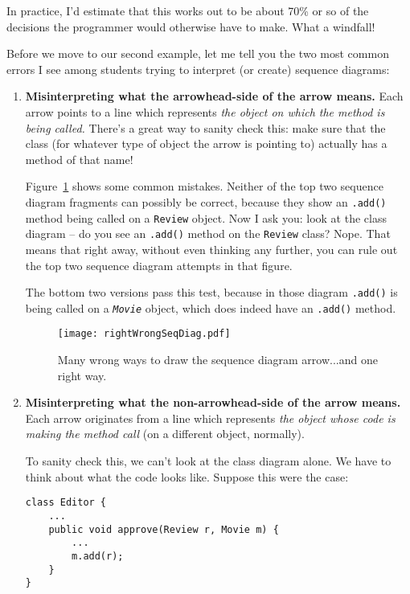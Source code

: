 In practice, I'd estimate that this works out to be about 70\% or so of the
decisions the programmer would otherwise have to make. What a windfall!

Before we move to our second example, let me tell you the two most common
errors I see among students trying to interpret (or create) sequence diagrams:

\begin{enumerate}
\itemsep.1em
\item \textbf{Misinterpreting what the arrowhead-side of the arrow means.}
Each arrow points to a line which represents \textit{the object on which the
method is being called.} There's a great way to sanity check this: make sure
that the class (for whatever type of object the arrow is pointing to) actually
has a method of that name!

Figure~\ref{fig:rightWrongSeqDiag} shows some common mistakes. Neither of the
top two sequence diagram fragments can possibly be correct, because they show
an \texttt{.add()} method being called on a \texttt{Review} object. Now I ask
you: look at the class diagram -- do you see an \texttt{.add()} method on the
\texttt{Review} class? Nope. That means that right away, without even thinking
any further, you can rule out the top two sequence diagram attempts in that
figure.

The bottom two versions pass this test, because in those diagram
\texttt{.add()} is being called on a \textit{\texttt{Movie}} object, which
does indeed have an \texttt{.add()} method.

\begin{figure}
\centering
\texttt{[image: rightWrongSeqDiag.pdf]}  %
\caption{Many wrong ways to draw the sequence diagram arrow...and one right
way.}
\label{fig:rightWrongSeqDiag}
\end{figure}

\item \textbf{Misinterpreting what the non-arrowhead-side of the arrow means.}
Each arrow originates from a line which represents \textit{the object whose
code is making the method call} (on a different object, normally). 

To sanity check this, we can't look at the class diagram alone. We have to
think about what the code looks like. Suppose this were the case:

\begin{Verbatim}[fontsize=\small,samepage=true,frame=single]
class Editor {
    ...
    public void approve(Review r, Movie m) {
        ...
        m.add(r);
    }
}
\end{Verbatim}


\end{enumerate}
